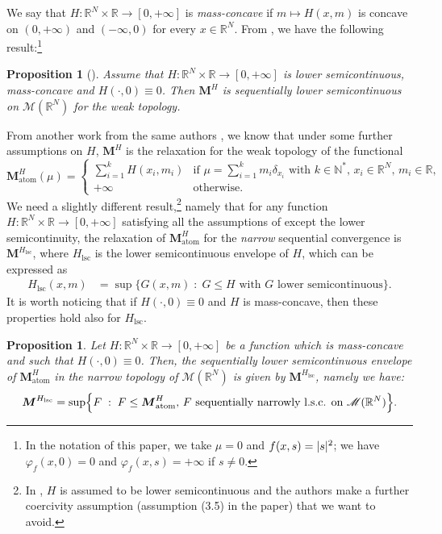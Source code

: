 \documentclass[10pt]{amsart}
\theoremstyle{plain}
\newtheorem{proposition}[theorem]{Proposition}
\theoremstyle{definition}
\newcommand{\N}{\mathbb{N}}
\newcommand{\R}{\mathbb{R}}
\newcommand{\Mspace}{\mathscr{M}}
\newcommand{\mass}{\boldsymbol{M}}
\newcommand{\lsc}{\mathrm{lsc}}
\newcommand{\st}{\;:\;}
\DeclarePairedDelimiter{\abs}{\lvert}{\rvert}
\begin{document}
We say that $H : \R^N \times \R \to [0,+\infty]$ is \emph{mass-concave} if $m\mapsto H(x,m)$ is concave on $(0,+\infty)$ and $(-\infty,0)$ for every $x\in\R^N$. From \cite{bouchitteNewLowerSemicontinuity1990}, we have the following result:\footnote{In the notation of this paper, we take \(\mu=0\) and \(f(x,s)=\abs{s}^2\); we have \(\varphi_{f}(x,0)=0\) and \(\varphi_{f}(x,s)=+\infty\) if \(s\neq 0\).}
\begin{proposition}[{\cite[Th.\,3.3]{bouchitteNewLowerSemicontinuity1990}}]\label{lscHmass}
Assume that \(H:\R^N\times\R\to[0,+\infty]\) is lower semicontinuous, mass-concave and $H(\cdot,0) \equiv 0$. Then \(\mass^H\) is sequentially lower semicontinuous on \(\Mspace(\R^N)\) for the weak topology.
\end{proposition}
From another work from the same authors \cite[Th.\,3.2]{bouchitteRelaxationClassNonconvex1993}, we know that under some further assumptions on $H$, \(\mass^H\) is the relaxation for the weak topology of the functional
\[
\mass_\mathrm{atom}^H(\mu)=
\begin{cases}
\sum_{i=1}^k H(x_i,m_i)&\text{if \(\mu=\sum_{i=1}^k m_i\delta_{x_i}\) with $k\in \N^\ast$, $x_i\in\R^N$, \(m_i \in\R\),}\\
+\infty&\text{otherwise.}
\end{cases}
\]
We need a slightly different result,\footnote{In \cite[Th.\,3.2]{bouchitteRelaxationClassNonconvex1993}, $H$ is assumed to be lower semicontinuous and the authors make a further coercivity assumption (assumption (3.5) in the paper) that we want to avoid.} namely that for any function \(H:\R^N\times\R\to[0,+\infty]\) satisfying all the assumptions of  except the lower semicontinuity, the relaxation of \(\mass_\mathrm{atom}^H\) for the \emph{narrow} sequential convergence is \(\mass^{H_\lsc}\), where \(H_\lsc\) is the lower semicontinuous envelope of \(H\), which can be expressed as
\begin{align}\label{semicontinuousEnvelope}
H_\lsc(x,m)&=
\sup\{G(x,m)\st G\leq H\text{ with \(G\) lower semicontinuous}\}.
\end{align}
It is worth noticing that if $H(\cdot,0) \equiv 0$ and $H$ is mass-concave, then these properties hold also for $H_\lsc$.

\begin{proposition}\label{relaxationMass}
Let \(H:\R^N\times\R\to[0,+\infty]\) be a function which is mass-concave and such that \(H(\cdot,0)\equiv 0\). Then, the sequentially lower semicontinuous envelope of \(\mass_\mathrm{atom}^H\) in the narrow topology of \(\Mspace(\R^N)\) is given by \(\mass^{H_\lsc}\), namely we have:
\begin{equation}
\label{relaxationFormula}
\mass^{H_\lsc}=\sup\Bigl\{F\st F\leq \mass_\mathrm{atom}^H\text{, \(F\) sequentially narrowly l.s.c. on \(\Mspace(\R^N)\)}\Bigr\}.
\end{equation}
\end{proposition}
\end{document}
